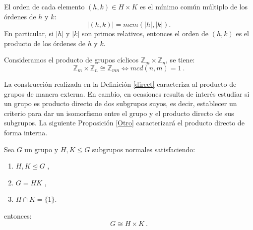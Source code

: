 \begin{proposition}
    El orden de cada elemento $(h,k) \in H \times K$ es el mínimo común múltiplo de los órdenes de $h$ y $k$:
    \[
    |(h,k)| = mcm(|h|,|k|) .
    \]
    En particular, si $|h|$ y $|k|$ son primos relativos, entonces el orden de $(h,k)$ es el producto de los órdenes de $h$ y $k$.
\end{proposition}




\begin{proposition} \label{ciclico}
Consideramos el producto de grupos cíclicos $\mathbb{Z}_m \times \mathbb{Z}_n$, se tiene:
\[
    \mathbb{Z}_m \times \mathbb{Z}_n \cong \mathbb{Z}_{mn} \Longleftrightarrow mcd(n,m)=1 \:.
\]
\end{proposition}



La construcción realizada en la Definición \ref{direct} caracteriza al producto de grupos de manera externa.  En cambio, en ocasiones resulta de interés estudiar si un grupo es producto directo de dos subgrupos suyos, es decir, establecer un criterio para dar un isomorfismo entre el grupo y el producto directo de sus subgrupos. La siguiente Proposición \ref{Otro} caracterizará el producto directo de forma interna.


\newpage
\begin{proposition} \label{Otro}
    Sea $G$ un grupo y $H, K \leq G$ subgrupos normales satisfaciendo:
    \begin{enumerate}
    \item $H,K  \trianglelefteq G$ ,
        \item $G = HK$  ,
        \item $H \cap K = \{1\}$.
    \end{enumerate}
    entonces:
    \[
        G \cong H \times K \: .
    \]
\end{proposition}




